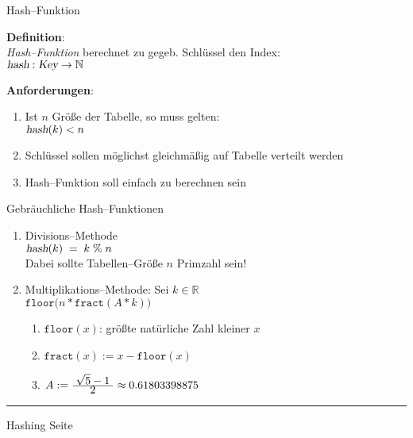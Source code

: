 
\begin{slide}{}
\normalsize

\begin{center}
Hash--Funktion
\end{center}
\vspace*{0.5cm}

\footnotesize

\textbf{Definition}: \\[0.3cm]
\emph{Hash--Funktion} berechnet zu gegeb. Schl\"ussel den Index: \\[0.3cm]
\hspace*{1.3cm} $\textsl{hash}: \textsl{Key} \rightarrow \mathbb{N}$

\textbf{Anforderungen}:
\begin{enumerate}
\item Ist $n$ Gr\"o{\ss}e der Tabelle, so muss gelten: \\[0.3cm]
      \hspace*{1.3cm} $\textsl{hash}(k) < n$
\item Schl\"ussel sollen m\"oglichst gleichm\"a{\ss}ig auf Tabelle verteilt werden
\item Hash--Funktion soll einfach zu berechnen sein
\end{enumerate}
Gebr\"auchliche Hash--Funktionen
\begin{enumerate}
\item Divisions--Methode \\[0.3cm]
      \hspace*{1.3cm} $\textsl{hash}(k) \;=\; k\;\%\; n$ \\[0.3cm]
      Dabei sollte Tabellen--Gr\"o{\ss}e $n$  Primzahl sein!
\item Multiplikations--Methode: Sei $k\in\mathbb{R}$ \\[0.3cm]
      \hspace*{1.3cm} $\mathtt{floor}\bigg(n * \mathtt{fract}(A * k) \bigg)$ 
      \begin{enumerate}
      \item $\mathtt{floor}(x)$: gr\"o{\ss}te nat\"urliche Zahl kleiner $x$
      \item $\mathtt{fract}(x) := x - \mathtt{floor}(x)$
      \item $A := \frac{\displaystyle\;\sqrt{5} - 1\;}{\displaystyle\;2\;} \approx 0.61803398875$    
      \end{enumerate}
\end{enumerate}


\vspace*{\fill}
\tiny \addtocounter{mypage}{1}
\rule{17cm}{1mm}
Hashing  \hspace*{\fill} Seite 
\end{slide}

